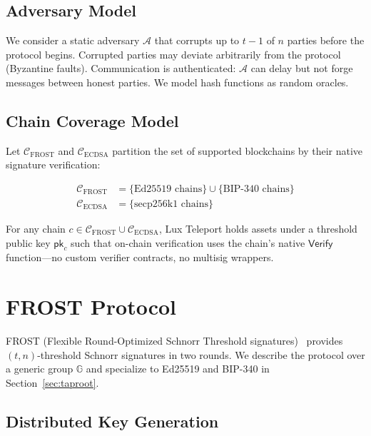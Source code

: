 \documentclass[11pt,twocolumn]{article}
\begin{document}
\subsection{Adversary Model}

We consider a static adversary $\mathcal{A}$ that corrupts up to $t-1$ of $n$
parties before the protocol begins. Corrupted parties may deviate arbitrarily from the
protocol (Byzantine faults). Communication is authenticated: $\mathcal{A}$ can delay
but not forge messages between honest parties. We model hash functions as random
oracles.

\subsection{Chain Coverage Model}

Let $\mathcal{C}_{\text{FROST}}$ and $\mathcal{C}_{\text{ECDSA}}$ partition the set
of supported blockchains by their native signature verification:

\begin{align*}
  \mathcal{C}_{\text{FROST}} &= \{\text{Ed25519 chains}\} \cup \{\text{BIP-340 chains}\} \\
  \mathcal{C}_{\text{ECDSA}} &= \{\text{secp256k1 chains}\}
\end{align*}

For any chain $c \in \mathcal{C}_{\text{FROST}} \cup \mathcal{C}_{\text{ECDSA}}$,
Lux Teleport holds assets under a threshold public key $\mathsf{pk}_c$ such that
on-chain verification uses the chain's native $\mathsf{Verify}$ function---no custom
verifier contracts, no multisig wrappers.

\section{FROST Protocol}
\label{sec:frost}

FROST (Flexible Round-Optimized Schnorr Threshold signatures)~\cite{komlo2020frost}
provides $(t,n)$-threshold Schnorr signatures in two rounds. We describe the protocol
over a generic group $\mathbb{G}$ and specialize to Ed25519 and BIP-340 in
Section~\ref{sec:taproot}.

\subsection{Distributed Key Generation}
\end{document}
